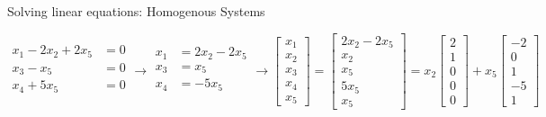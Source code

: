 \documentclass[aspectratio=169]{beamer}
\begin{document}
\begin{frame}[t]{Solving linear equations: Homogenous Systems}
\begin{scriptsize}
\[
\begin{split}
x_1 - 2x_2 + 2x_5 & = 0\\
x_3 - x_5 & = 0\\
x_4 + 5x_5 & = 0\\
\end{split} \longrightarrow
\begin{split}
x_1 &=  2x_2 - 2x_5\\
x_3 &=  x_5\\
x_4 &= -5x_5\\
\end{split} \longrightarrow
\begin{bmatrix}
x_1\\ x_2\\ x_3\\ x_4\\ x_5
\end{bmatrix} = \begin{bmatrix}
2x_2 - 2x_5\\ x_2\\ x_5\\ 5x_5\\ x_5
\end{bmatrix} = x_2\begin{bmatrix}
2\\ 1\\ 0\\ 0\\ 0
\end{bmatrix} + x_5\begin{bmatrix}
-2\\ 0\\ 1\\ -5\\ 1
\end{bmatrix}
\]
\end{scriptsize}
\end{frame}
\end{document}
